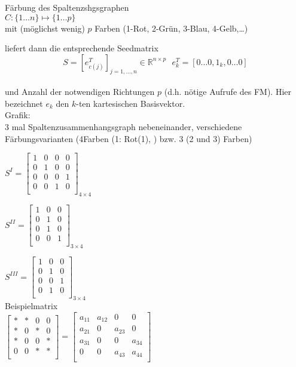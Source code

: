 Färbung des Spaltenzshgsgraphen\\
$C:\{1\dots n\}\mapsto \{1\dots p\}$\\
mit (möglichst wenig) $p$ Farben (1-Rot, 2-Grün, 3-Blau, 4-Gelb,\dots)

liefert dann die entsprechende Seedmatrix
$$S = [e^T_{c(j)}]_{j=1,\dots,n}\in \mathbb{R}^{n\times p}\ \ \ e_k^T = [0 \dots 0,1_k, 0 \dots 0]$$\\
und Anzahl der notwendigen Richtungen $p$ (d.h. nötige Aufrufe des FM). Hier bezeichnet  $e_k$ den $k$-ten kartesischen Basisvektor.\\

\noindent
Grafik:\\3 mal Spaltenzusammenhangsgraph nebeneinander, verschiedene Färbungsvarianten (4Farben (1: Rot(1), ) bzw. 3 (2 und 3) Farben)

$ S^I = \begin{bmatrix}
1	& 0	& 0	& 0	\\
0	& 1	& 0	& 0	\\
0	& 0	& 0	& 1	\\
0	& 0	& 1	& 0	\\
\end{bmatrix}_{4\times 4}$

$ S^{II} = \begin{bmatrix}
1	& 0	& 0	\\
0	& 1	& 0	\\
0	& 1	& 0	\\
0	& 0	& 1	\\
\end{bmatrix}_{3\times 4}$


$ S^{III} = \begin{bmatrix}
1	& 0	& 0	\\
0	& 1	& 0	\\
0	& 0	& 1	\\
0	& 1	& 0	\\
\end{bmatrix}_{3\times 4}$\\

Beispielmatrix\\
$\begin{bmatrix}
*	& *	& 0	& 0	\\
*	& 0	& *	& 0	\\
*	& 0	& 0	& *	\\
0	& 0	& *	& *	\\
\end{bmatrix}
=
\begin{bmatrix}
a_{11}	& a_{12}	& 0	& 0	\\
a_{21}	& 0	& a_{23}	& 0	\\
a_{31}	& 0	& 0	& a_{34}	\\
0	& 0	& a_{43}	& a_{44}	\\
\end{bmatrix}
$\\

